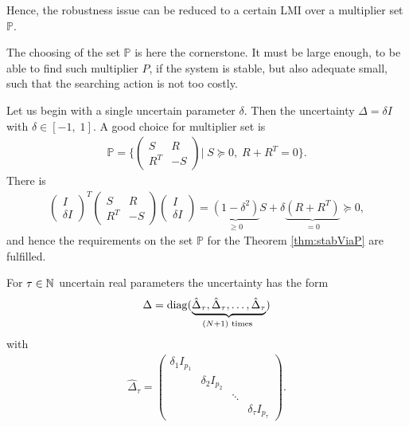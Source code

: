 Hence, the robustness issue can be reduced to a certain LMI over a multiplier set $\mathbb{P}$. 

The choosing of the set $\mathbb{P}$ is here the cornerstone. It must be large enough, to be able to find such multiplier $P$, if the system is stable, but also adequate small, such that the searching action is not too costly. 
 
Let us begin with a single uncertain parameter $\delta$. Then the uncertainty $\Delta = \delta I$ with $\delta \in [-1,\; 1]$. 
A good choice for multiplier set is 
\begin{align}
\mathbb{P}= \{ \begin{pmatrix}
S & R \\ R^T & -S
\end{pmatrix}| \; S \succeq 0 , \; R + R^T = 0\}.
\end{align}
There is 
\begin{align}
\begin{pmatrix}
I \\ \delta I
\end{pmatrix}^T 
\begin{pmatrix}
S & R \\ R^T & -S
\end{pmatrix}
\begin{pmatrix}
I \\ \delta I
\end{pmatrix} = \underbrace{(1 - \delta^2 )}_{\geq 0}S + \delta\underbrace{(R + R^T)}_{=0} \succeq 0,
\end{align}
and hence the requirements on the set $\mathbb{P}$ for the Theorem \eqref{thm:stabViaP} are fulfilled. 

For $\tau \in {\mathbb{N}}$ uncertain real parameters the uncertainty has the form 
\begin{align}\Delta= \operatorname*{diag}(\underbrace{\hat{\Delta}_\tau, \hat{\Delta}_\tau, \dots, \hat{\Delta}_\tau}_{(N+1) \text{ times }})\end{align}
with
\begin{align}
\hat{\Delta}_\tau = \begin{pmatrix}
\delta_1 I_{p_1}& & & \\
& \delta_2 I_{p_2} & & \\
& & \ddots & \\
& & & \delta_\tau I_{p_\tau}
\end{pmatrix}.
\end{align}

